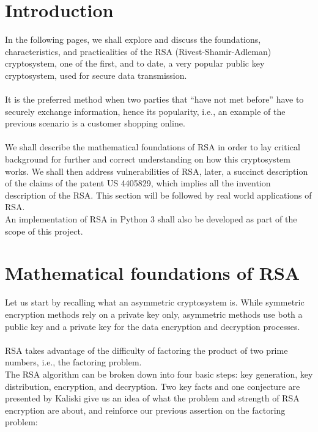 \documentclass[12pt, a4paper]{article}
\begin{document}
\section{Introduction}
In the following pages, we shall explore and discuss the foundations, characteristics, and practicalities of the RSA (Rivest-Shamir-Adleman) cryptosystem, one of the first, and to date, a very popular public key cryptosystem, used for secure data transmission. \\ \\
It is the preferred method when two parties that “have not met before” have to securely exchange information, hence its popularity, i.e., an example of the previous scenario is a customer shopping online.\\ \\
We shall describe the mathematical foundations of RSA in order to lay critical background for further and correct understanding on how this cryptosystem works. We shall then address vulnerabilities of RSA, later, a succinct description of the claims of the patent US 4405829, which implies all the invention description of the RSA. This section will be followed by real world applications of RSA. \\
An implementation of RSA in Python 3 shall also be developed as part of the scope of this project.

\section{Mathematical foundations of RSA}\label{mathematical foundations of RSA}
Let us start by recalling what an asymmetric cryptosystem is. While symmetric encryption methods rely on a private key only, asymmetric methods use both a public key and a private key for the data encryption and decryption processes. \\ \\
RSA takes advantage of the difficulty of factoring the product of two prime numbers, i.e., the factoring problem. \\ 
The RSA algorithm can be broken down into four basic steps: key generation, key distribution, encryption, and decryption.
Two key facts and one conjecture are presented by Kaliski give us an idea of what the problem and strength of RSA encryption are about, and reinforce our previous assertion on the factoring problem:
\end{document}
